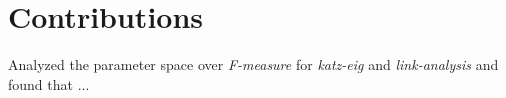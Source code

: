 
\section{Contributions}\label{sec:intro:contributions}

Analyzed the parameter space over \textit{F-measure} for \textit{katz-eig} and \textit{link-analysis} and found that ...

